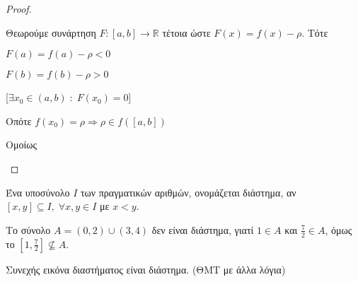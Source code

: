 \documentclass[main.tex]{subfiles}
\begin{document}
        \begin{proof}
        \item {}
            \begin{description}
                \item [1η Περίπτωση: $(f(a)< \rho < f(b))$]
                \item {}
                    Θεωρούμε συνάρτηση $ F \colon [a,b] \to \mathbb{R} $ τέτοια ώστε $ 
                    F(x) = f(x) - \rho$. Τότε 

                    \begin{minipage}{0.3\textwidth}
                        \begin{myitemize}
                        \item $F(a) = f(a) - \rho < 0 $ \hfill {}
                        \item $F(b) = f(b) - \rho >0 $ \hfill  {}
                        \end{myitemize}
                    \end{minipage}
                    [$ \exists x_{0} \in (a,b) \; : \; F(x_{0}) = 0 $]

                    Οπότε 
                    $ 
                    f(x_{0}) = \rho \Rightarrow \rho \in f([a,b])
                    $

                \item [2η Περίπτωση: $(f(b)< \rho < f(a))$]
                \item {}
                    Ομοίως
            \end{description}
        \end{proof}

        \begin{dfn}
            Ένα υποσύνολο $I$ των πραγματικών αριθμών, ονομάζεται διάστημα, αν 
            $ [x,y] \subseteq I, \; \forall x,y \in I $ με $ x<y $.
        \end{dfn}

        \begin{example}
            Το σύνολο $ A = (0,2) \cup (3,4) $ δεν είναι διάστημα, γιατί $ 1 \in A $ και 
            $ \frac{7}{2} \in A $, όμως το $ \left[1, \frac{7}{2}\right] \not\subseteq A $.
        \end{example}

        \begin{thm}
            Συνεχής εικόνα διαστήματος είναι διάστημα. (ΘΜΤ με άλλα λόγια)
        \end{thm}
\end{document}
